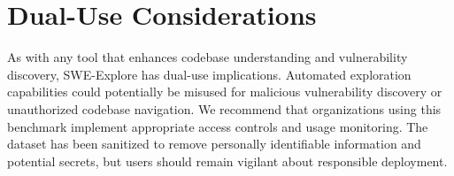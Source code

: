 \documentclass{llmxive}
\begin{document}
\section*{Dual-Use Considerations}

As with any tool that enhances codebase understanding and vulnerability discovery, SWE-Explore has dual-use implications. Automated exploration capabilities could potentially be misused for malicious vulnerability discovery or unauthorized codebase navigation. We recommend that organizations using this benchmark implement appropriate access controls and usage monitoring. The dataset has been sanitized to remove personally identifiable information and potential secrets, but users should remain vigilant about responsible deployment.
\end{document}
